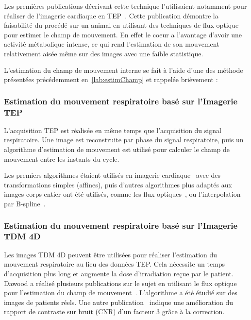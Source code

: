 Les premières publications décrivant cette technique l'utilisaient notamment pour réaliser de l'imagerie cardiaque en TEP~\cite{klein19973d}. Cette publication démontre la faisabilité du procédé sur un animal en utilisant des techniques de flux optique pour estimer le champ de mouvement. En effet le coeur a l'avantage d'avoir une activité métabolique intense, ce qui rend l'estimation de son mouvement relativement aisée même sur des images avec une faible statistique.

L'estimation du champ de mouvement interne se fait à l'aide d'une des méthode présentées précédemment en~\ref{lab:estimChamp} et rappelée brièvement :

\subsubsection{Estimation du mouvement respiratoire basé sur l'Imagerie TEP}
\label{lab:correctionDawood2008}

L'acquisition TEP est réalisée en même temps que l'acquisition du signal respiratoire. Une image est reconstruite par phase du signal respiratoire, puis un algorithme d'estimation de mouvement est utilisé pour calculer le champ de mouvement entre les instants du cycle.

Les premiers algorithmes étaient utilisés en imagerie cardiaque~\cite{klein2002four} avec des transformations simples (affines), puis d'autres algorithmes plus adaptés aux images corps entier ont été utilisés, comme les flux optiques~\cite{dawood2006lung, dawood2006lung}, ou l'interpolation par B-spline~\cite{bai2009regularized}. 


\subsubsection{Estimation du mouvement respiratoire basé sur l'Imagerie TDM 4D}

Les images TDM 4D peuvent être utilisées pour réaliser l'estimation du mouvement respiratoire au lieu des données TEP. Cela nécessite un temps d'acquisition plus long et augmente la dose d'irradiation reçue par le patient.
Dawood a réalisé plusieurs publications sur le sujet en utilisant le flux optique pour l'estimation du champ de mouvement~\cite{dawood2006lung, dawood2008respiratory}. L'algorithme a été étudié sur des images de patients réels. Une autre publication~\cite{thorndyke2006reducing} indique une amélioration du rapport de contraste sur bruit (CNR) d'un facteur 3 grâce à la correction.


